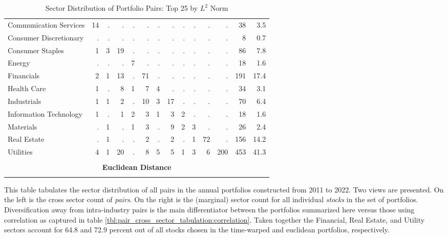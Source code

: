 \documentclass[12pt]{article}
\begin{document}
\begin{table}[!htb]
\begin{tabular}{l r r r r r r r r r r r | r r}
        Communication Services   & 14 &  . &  . &  . &  . &  . &  . &  . &  . &  . &   . &  38 &  3.5 \\
        Consumer Discretionary   &  . &  . &  . &  . &  . &  . &  . &  . &  . &  . &   . &   8 &  0.7 \\
        Consumer Staples         &  1 &  3 & 19 &  . &  . &  . &  . &  . &  . &  . &   . &  86 &  7.8 \\
        Energy                   &  . &  . &  . &  7 &  . &  . &  . &  . &  . &  . &   . &  18 &  1.6 \\
        Financials               &  2 &  1 & 13 &  . & 71 &  . &  . &  . &  . &  . &   . & 191 & 17.4 \\
        Health Care              &  1 &  . &  8 &  1 &  7 &  4 &  . &  . &  . &  . &   . &  34 &  3.1 \\
        Industrials              &  1 &  1 &  2 &  . & 10 &  3 & 17 &  . &  . &  . &   . &  70 &  6.4 \\
        Information Technology   &  1 &  . &  1 &  2 &  3 &  1 &  3 &  2 &  . &  . &   . &  18 &  1.6 \\
        Materials                &  . &  1 &  . &  1 &  3 &  . &  9 &  2 &  3 &  . &   . &  26 &  2.4 \\
        Real Estate              &  . &  1 &  . &  . &  2 &  . &  2 &  . &  1 & 72 &   . & 156 & 14.2 \\
        Utilities                &  4 &  1 & 20 &  . &  8 &  5 &  5 &  1 &  3 &  6 & 200 & 453 & 41.3 \\
        \vspace{0.25 mm} \\
        \multicolumn{14}{c}{\textbf{Euclidean Distance}} \\
        \vspace{1 mm} \\
        \hline
    \end{tabular}
    \caption{Sector Distribution of Portfolio Pairs: Top 25 by $L^{2}$ Norm}
    \begin{tablenotes}
        \item{\footnotesize This table tabulates the sector distribution of all pairs in the annual portfolios constructed from 2011 to 2022. Two views are presented. On the left is the cross sector count of \textit{pairs}. On the right is the (marginal) sector count for all individual \textit{stocks} in the set of portfolios. Diversification away from intra-industry pairs is the main differentiator between the portfolios summarized here versus those using correlation as captured in table \ref{tbl:pair_cross_sector_tabulation:correlation}. Taken together the Financial, Real Estate, and Utility sectors account for 64.8 and 72.9 percent out of all stocks chosen in the time-warped and euclidean portfolios, respectively.}
    \end{tablenotes}
\end{table}
\end{document}

